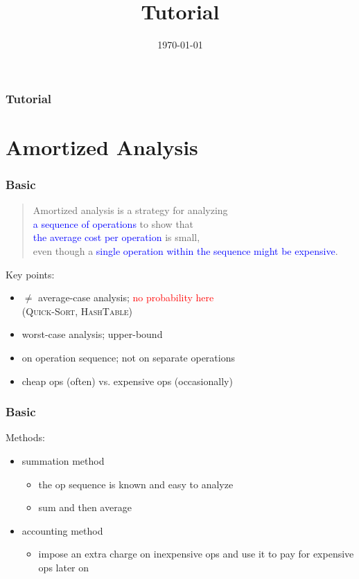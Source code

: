 \documentclass{beamer}
\title{Tutorial}
\date{\today}
\begin{document}
\begin{frame}
	\titlepage
\end{frame}

\begin{frame}
	\frametitle{Tutorial}
	\tableofcontents
\end{frame}

\section{Amortized Analysis}

\begin{frame}
  \frametitle{Basic}
  \begin{quote}
    Amortized analysis is a strategy for analyzing \\ 
    \textcolor{blue}{a sequence of operations} to show that \\
    \textcolor{blue}{the average cost per operation} is small, \\ 
    even though a \textcolor{blue}{single operation within the sequence might be
    expensive}.
  \end{quote}
  
  \vspace{0.30cm}
  Key points:
  \begin{itemize}
    \setlength{\itemsep}{3pt}
    \item $\neq$ average-case analysis; \textcolor{red}{no probability here}\\
    (\textsc{Quick-Sort}, \textsc{HashTable})
    \item worst-case analysis; upper-bound
    \item on operation sequence; not on separate operations
    \item cheap ops (often) vs. expensive ops (occasionally)
  \end{itemize}
\end{frame}

\begin{frame}
  \frametitle{Basic}
  
  Methods:
  \begin{itemize}
    \setlength{\itemsep}{3pt}
    \item summation method
    \begin{itemize}
      \item the op sequence is known and easy to analyze
      \item sum and then average
    \end{itemize}
    \item accounting method
    \begin{itemize}
      \item impose an extra charge on inexpensive ops and use it to pay
      for expensive ops later on
    \end{itemize}
  \end{itemize}
\end{frame}
\end{document}
